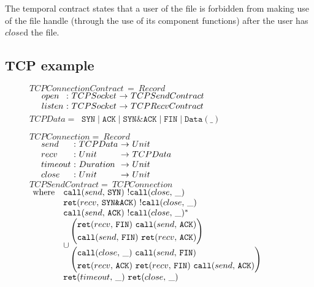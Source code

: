 \documentclass[preprint,onecolumn,9pt]{sigplanconf} %
\begin{document}
The temporal contract states that a user of the file is forbidden from making use of the file handle (through the use of its component functions) after the user has $close$d the file.

\subsection{TCP example}

\newcommand*{\tcpstyle}[1]{\texttt{#1}}
\begin{figure}
 \newcommand*{\send}[1]{\scallev{send}{#1}}
 \newcommand*{\rcv}[1]{\sretev{recv}{#1}}
 \newcommand*{\notclose}{\snonevent{\call{close}}}
 \newcommand*{\tcpsyn}{\tcpstyle{SYN}}
 \newcommand*{\tcpack}{\tcpstyle{ACK}}
 \newcommand*{\tcpsynack}{\tcpstyle{SYN\&ACK}}
 \newcommand*{\tcpfin}{\tcpstyle{FIN}}
 $TCPConnectionContract\, =~ Record$ \\
 $\begin{array}{ @{\quad~}l@{\ :} @{~}l @{\ \to\ }l }
  open & TCPSocket & TCPSendContract \\
  listen & TCPSocket & TCPRecvContract
 \end{array}$ \\
 $TCPData =$
 $~ \tcpsyn \mid \tcpack \mid \tcpsynack \mid \tcpfin \mid \tcpstyle{Data}(\_)$
 
 $TCPConnection =~ Record$ \\
 $\begin{array}{ @{\quad~}l@{\ :} @{~}l@{\ \to\ } l }
  send & TCPData & Unit \\
  recv & Unit & TCPData \\
  timeout & Duration & Unit \\
  close & Unit & Unit
 \end{array}$ \\
 
 $TCPSendContract =~ TCPConnection$ \\
 $\begin{array}{ @{~}r@{\quad} l @{}l }
  \text{where}
  &&\send{\tcpsyn}~ \notclose \\
  &&\rcv{\tcpsynack}~ \notclose \\
  &&\send{\tcpack}~ \stmany{\notclose} \\

  &&\cup
  \begin{aligned}
   &\left(
    \begin{aligned}
     &\rcv{\tcpfin}~ \send{\tcpack} \\
     &\send{\tcpfin}~ \rcv{\tcpack}
    \end{aligned}
   \right) \\
   &\left(
    \begin{aligned}
     &\call{close}~ \send{\tcpfin} \\
     &\rcv{\tcpack}~ \rcv{\tcpfin}~ \send{\tcpack}
    \end{aligned}
   \right)
  \end{aligned} \\
  &&\ret{timeout}~ \ret{close}
 \end{array}$
 

\end{figure}
\end{document}
